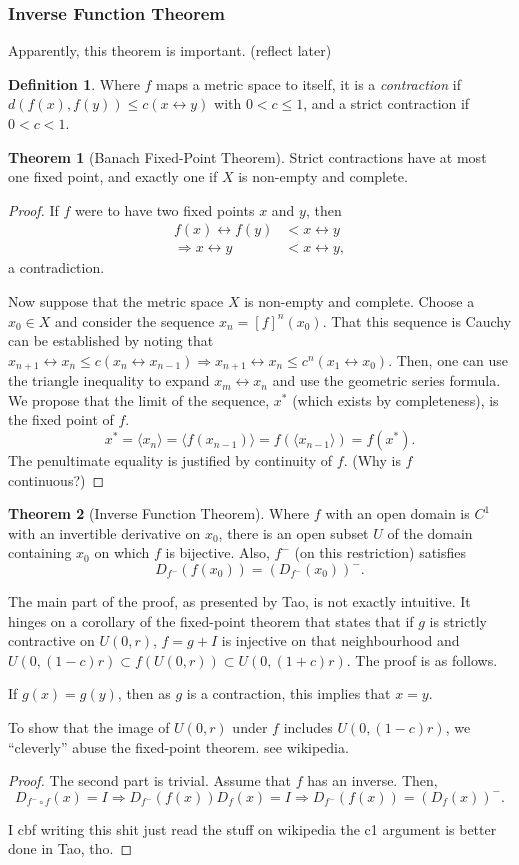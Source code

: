 \documentclass{article}
\newcommand{\lra}{\leftrightarrow}
\theoremstyle{definition}
\newtheorem{thm}{Theorem}[subsubsection]
\newtheorem{defn}{Definition}[subsubsection]
\begin{document}
\subsubsection{Inverse Function Theorem}
Apparently, this theorem is important. (reflect later)
\begin{defn}
	Where $f$ maps a metric space to itself, it is a \emph{contraction} if $d(f(x),f(y))\leq c(x\lra y)$ with $0<c\leq1$, and a strict contraction if $0<c<1$.
\end{defn}
\begin{thm}[Banach Fixed-Point Theorem]
	Strict contractions have at most one fixed point, and exactly one if $X$ is non-empty and complete.
\end{thm}
\begin{proof}
	If $f$ were to have two fixed points $x$ and $y$, then
	\begin{align*}
		f(x)\lra f(y)&<x\lra y\\
		\Rightarrow x\lra y&<x\lra y,
	\end{align*}
	a contradiction.\par
	Now suppose that the metric space $X$ is non-empty and complete. Choose a $x_0\in X$ and consider the sequence $x_n=[f]^n(x_0)$. That this sequence is Cauchy can be established by noting that $x_{n+1}\lra x_n\leq c(x_n\lra x_{n-1})\Rightarrow x_{n+1}\lra x_n\leq c^n(x_1\lra x_0)$. Then, one can use the triangle inequality to expand $x_m\lra x_n$ and use the geometric series formula. We propose that the limit of the sequence, $x^*$ (which exists by completeness), is the fixed point of $f$.
	\[x^*=\langle x_n\rangle=\langle f(x_{n-1})\rangle=f(\langle x_{n-1}\rangle)=f(x^*).\] The penultimate equality is justified by continuity of $f$. (Why is $f$ continuous?)
\end{proof}
\begin{thm}[Inverse Function Theorem]\label{ift}
	Where $f$ with an open domain is $C^1$ with an invertible derivative on $x_0$, there is an open subset $U$ of the domain containing $x_0$ on which $f$ is bijective. Also, $f^-$ (on this restriction) satisfies
	\[D_{f^-}(f(x_0))=(D_{f^-}(x_0))^-.\]
\end{thm}
The main part of the proof, as presented by Tao, is not exactly intuitive. It hinges on a corollary of the fixed-point theorem that states that if $g$ is strictly contractive on $U(0,r)$, $f=g+I$ is injective on that neighbourhood and $U(0,(1-c)r)\subset f(U(0,r))\subset U(0,(1+c)r)$. The proof is as follows.\par
If $g(x)=g(y)$, then as $g$ is a contraction, this implies that $x=y$.\par
To show that the image of $U(0,r)$ under $f$ includes $U(0,(1-c)r)$, we ``cleverly'' abuse the fixed-point theorem. see wikipedia.
\begin{proof}
	The second part is trivial. Assume that $f$ has an inverse. Then, \[D_{f^-\circ f}(x)=I\Rightarrow D_{f^-}(f(x))D_f(x)=I\Rightarrow D_{f^-}(f(x))=(D_f(x))^-.\]
	
	I cbf writing this shit just read the stuff on wikipedia 
	the c1 argument is better done in Tao, tho.
\end{proof}
\end{document}
